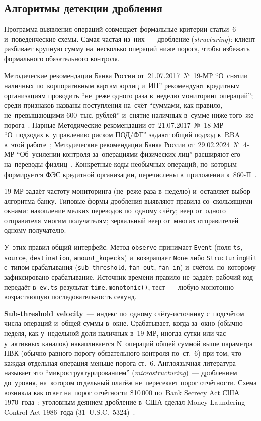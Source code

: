 \subsection*{Алгоритмы детекции дробления}

Программа выявления операций совмещает формальные критерии статьи~6
и~поведенческие схемы. Самая частая из~них~--- дробление
(\textit{structuring}): клиент разбивает крупную сумму на~несколько операций
ниже порога, чтобы избежать формального обязательного контроля.

Методические рекомендации Банка России от~21.07.2017~№~19-МР
\enquote{О~снятии наличных по~корпоративным картам юрлиц и~ИП} рекомендуют кредитным
организациям проводить \enquote{не~реже одного раза в~неделю мониторинг операций};
среди признаков названы поступления на~счёт \enquote{суммами, как правило,
не~превышающими 600~тыс. рублей} и~снятие наличных в~сумме ниже того~же
порога~\cite{cbr-19mr}. Парные
Методические рекомендации от~21.07.2017~№~18-МР \enquote{О~подходах к~управлению
риском ПОД/ФТ} задают общий подход к~RBA в~этой работе~\cite{cbr-18mr};
Методические рекомендации Банка России от~29.02.2024~№~4-МР \enquote{Об~усилении
контроля за~операциями физических лиц} расширяют его на~переводы
физлиц~\cite{cbr-4mr}. Конкретные коды необычных операций, по~которым
формируется ФЭС кредитной организации, перечислены в~приложении
к~860-П~\cite{cbr-860p}.

19-МР задаёт частоту мониторинга (не~реже раза в~неделю) и~оставляет
выбор алгоритма банку. Типовые формы дробления выявляют правила
со~скользящими окнами: накопление мелких переводов по~одному счёту;
веер от~одного отправителя многим получателям; зеркальный веер
от~многих отправителей одному получателю.

У~этих правил общий интерфейс. Метод \texttt{observe} принимает
\texttt{Event} (поля \texttt{ts}, \texttt{source}, \texttt{destination},
\texttt{amount\_kopecks}) и~возвращает \texttt{None} либо
\texttt{StructuringHit} с~типом срабатывания (\texttt{sub\_threshold},
\texttt{fan\_out}, \texttt{fan\_in}) и~счётом, по~которому зафиксировано
срабатывание. Источник времени правило не~задаёт: рабочий код передаёт
в~\texttt{ev.ts} результат \texttt{time.monotonic()}, тест~--- любую
монотонно возрастающую последовательность секунд.


\textbf{Sub-threshold velocity}~--- индекс по~одному счёту-источнику с~подсчётом
числа операций и~общей суммы в~окне. Срабатывает, когда за~окно (обычно неделя,
как у~недельной доли наличных в~19-МР, иногда сутки или час у~активных каналов) накапливается N~операций
общей суммой выше параметра ПВК (обычно равного порогу обязательного контроля
по~ст.~6) при том, что каждая отдельная операция меньше порога ст.~6.
Англоязычная литература называет это \enquote{микроструктурированием}
(\textit{microstructuring})~--- дроблением до~уровня, на~котором отдельный
платёж не~пересекает порог отчётности. Схема возникла как ответ на~порог
отчётности \$10\,000 по~Bank Secrecy Act США 1970~года~\cite{garg-aml-2025};
уголовным деянием дробление в~США сделал Money Laundering Control Act
1986~года (31~U.S.C.~5324)~\cite{usc-31-5324}.

